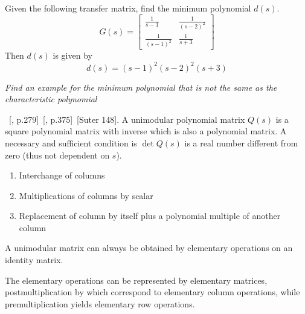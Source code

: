 \begin{example}
  Given the following transfer matrix, find the minimum polynomial $d(s)$.
  \begin{equation*}
  G(s)=
  \begin{bmatrix}
    \frac{1}{s-1}& \frac{1}{(s-2)^{2}} \\
    \frac{1}{(s-1)^{2}} & \frac{1}{s+3}
  \end{bmatrix}
  \end{equation*}
  Then $d(s)$ is given by
  \begin{equation*}
    d(s)=(s-1)^{2}(s-2)^{2}(s+3)
  \end{equation*}
\end{example}

\textit{Find an example for the minimum polynomial that is not the same as the characteristic polynomial}

\begin{defn-dan}~[\cite{sastry.adaptive.2011}, p.279]~[\cite{kailath.linear.1980}, p.375]~[Suter 148].
  A unimodular polynomial matrix $Q(s)$ is a square polynomial matrix with inverse which is also a polynomial matrix.
  A necessary and sufficient condition is $\det Q(s)$ is a real number different from zero (thus not dependent on $s$).
\end{defn-dan}

\begin{defn-dan}
\end{defn-dan}

\begin{defn-dan}
  \begin{enumerate}
    \item{Interchange of columns}
    \item{Multiplications of columns by scalar}
    \item{Replacement of column by itself plus a polynomial multiple of another column}
  \end{enumerate}
  A unimodular matrix can always be obtained by elementary operations on an identity matrix.
\end{defn-dan}

\begin{defn-dan}
  The elementary operations can be represented by elementary matrices, postmultiplication by which correspond to elementary column operations, while premultiplication yields elementary row operations.
\end{defn-dan}

